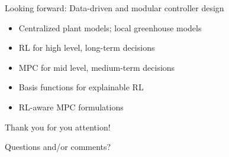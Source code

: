 \documentclass[xcolor=dvipsnames,aspectratio=169]{beamer}
\begin{document}
\begin{frame}{Looking forward: Data-driven and modular controller design}
	\begin{itemize}
		\item Centralized plant models; local greenhouse models
		\pause
		\item RL for high level, long-term decisions
		\pause
		\item MPC for mid level, medium-term decisions
		\pause
		\item Basis functions for explainable RL
		\pause
		\item RL-aware MPC formulations
	\end{itemize}

	\bigskip

	\begin{center}
		Thank you for you attention!
		
		\bigskip
		
		Questions and/or comments?
	\end{center}
\end{frame}
\end{document}
